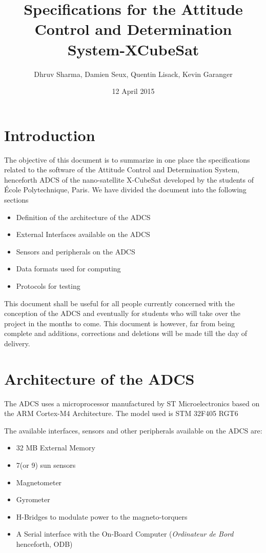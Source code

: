 \documentclass[11pt,a4paper]{report}
\title{Specifications for the Attitude Control and Determination System-XCubeSat}
\author{Dhruv Sharma, Damien Seux, Quentin Lisack, Kevin Garanger}
\date{12 April 2015}
\begin{document}
\maketitle

\tableofcontents
\listoffigures
\listoftables

\chapter{Introduction}

The objective of this document is to summarize in one place the specifications related to the software of the Attitude Control and Determination System, henceforth ADCS of the nano-satellite X-CubeSat developed by the students of École Polytechnique, Paris. We have divided the document into the following sections 

\begin{itemize}
\item 
Definition of the architecture of the ADCS 
\item 
External Interfaces available on the ADCS 
\item 
Sensors and peripherals on the ADCS 
\item 
Data formats used for computing 
\item 
Protocols for testing 
\end{itemize}

This document shall be useful for all people currently concerned with the conception of the ADCS and eventually for students who will take over the project in the months to come. This document is however, far from being complete and additions, corrections and deletions will be made till the day of delivery. 

\chapter{Architecture of the ADCS}\thispagestyle{fancy}

The ADCS uses a microprocessor manufactured by ST Microelectronics based on the ARM Cortex-M4 Architecture. The model used is STM 32F405 RGT6

The available interfaces, sensors and other peripherals available on the ADCS are: 

\begin{itemize}
\item 
32 MB External Memory  
\item 
7(or 9) sun sensors 
\item 
Magnetometer
\item 
Gyrometer
\item 
H-Bridges to modulate power to the magneto-torquers 
\item 
A Serial interface with the On-Board Computer (\textit{Ordinateur de Bord} henceforth, ODB) 
\end{itemize}
\end{document}
